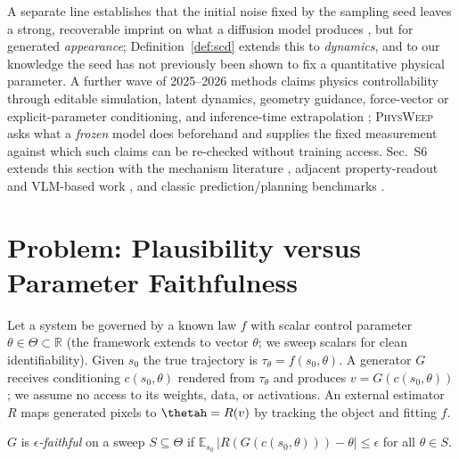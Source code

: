 \documentclass[10pt,twocolumn,letterpaper]{article}
\begin{document}
A separate line establishes that the initial noise fixed by the sampling
seed leaves a strong, recoverable imprint on what a diffusion model
produces \citep{xu2025goodseed}, but for generated \emph{appearance};
Definition~\ref{def:scd} extends this to \emph{dynamics}, and to our
knowledge the seed has not previously been shown to fix a quantitative
physical parameter. A further wave of 2025--2026 methods claims physics
controllability through editable simulation, latent dynamics, geometry
guidance, force-vector or explicit-parameter conditioning, and
inference-time extrapolation
\citep{physchoreo2025,phantom2026,physvideo2026,phyco2026,motionforcing2026,phyparam2026,gillman2025forceprompting,lapg2026};
\textsc{PhysWeep} asks what a \emph{frozen} model does beforehand and
supplies the fixed measurement against which such claims can be
re-checked without training access. Sec.~S6 extends this section with the
mechanism literature \citep{kang2025howfar,diffmemorize2025}, adjacent
property-readout and VLM-based work
\citep{inferring2025dynamic,invisiblehand2026,vlipp2025,travl2025,vlmcannotreason2026},
and classic prediction/planning benchmarks
\citep{bear2021physion,bakhtin2019phyre,unterthiner2018fvd,huang2024vbench}.

\section{Problem: Plausibility versus Parameter Faithfulness}
\label{sec:problem}

Let a system be governed by a known law $f$ with scalar control parameter
$\theta\in\Theta\subset\mathbb{R}$ (the framework extends to vector $\theta$;
we sweep scalars for clean identifiability). Given $s_0$ the true trajectory
is $\tau_\theta=f(s_0,\theta)$. A generator $G$ receives conditioning
$c(s_0,\theta)$ rendered from $\tau_\theta$ and produces $v=G(c(s_0,\theta))$;
we assume no access to its weights, data, or activations. An external
estimator $R$ maps generated pixels to $\thetah=R(v)$ by tracking the object
and fitting $f$.

\begin{definition}
$G$ is \emph{$\epsilon$-faithful} on a sweep $S\subseteq\Theta$ if
$\mathbb{E}_{s_0}\,|R(G(c(s_0,\theta)))-\theta| \le \epsilon$ for all
$\theta\in S$.
\end{definition}
\end{document}
